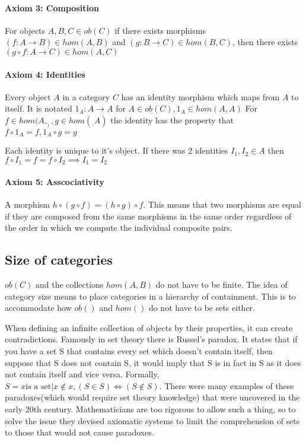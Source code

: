 \documentclass[10pt,a4paper]{amsart}
\begin{document}
\paragraph{Axiom 3: Composition}
For objects $A,B,C\in ob(C)$ if there exists morphisms $(f: A\to B)\in hom(A,B)$ and $(g: B\to C)\in hom(B,C)$, then there exists $(g\circ f: A\to C)\in hom(A,C)$
\paragraph{Axiom 4: Identities}
Every object $A$ in a category $C$ has an identity morphism which maps from $A$ to itself.
It is notated $1_A: A\to A$ for $A\in ob(C), 1_A\in hom(A,A)$
For $f\in hom(A,_), g\in hom(_,A)$ the identity has the property that $f\circ 1_A = f, 1_A\circ g = g$

Each identity is unique to it's object. If there was 2 identities $I_1,I_2\in A$ then $f\circ I_1 = f = f\circ I_2 \implies I_1=I_2$
\paragraph{Axiom 5: Asscociativity}
A morphism $h\circ(g\circ f) = (h\circ g)\circ f$. 
This means that two morphisms are equal if they are composed from the same morphisms in the same order
regardless of the order in which we compute the individual composite pairs.
\subsection{Size of categories}
$ob(C)$ and the collections $hom(A,B)$ do not have to be finite.
The idea of category size means to place categories in a hierarchy of containment.
This is to accommodate how $ob()$ and $hom()$ do not have to be sets either.

When defining an infinite collection of objects by their properties, it can create contradictions.
Famously in set theory there is Russel's paradox.
It states that if you have a set S that contains every set which doesn't contain itself,
then suppose that S does not contain S, 
it would imply that S is in fact in S as it does not contain itself and vice versa.
Formally, $S = {x \text{is a set} | x\notin x}, (S\in S) \iff (S\notin S)$.
There were many examples of these paradoxes(which would require set theory knowledge)
that were uncovered in the early 20th century.
Mathematicians are too rigorous to allow such a thing,
so to solve the issue they devised axiomatic systems to limit the comprehension of sets to those that would not cause paradoxes.
\end{document}
